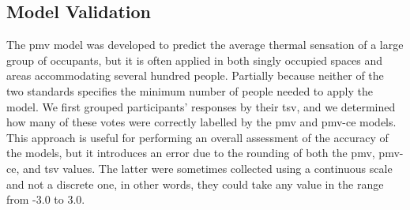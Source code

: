 \subsection{Model Validation}\label{subsec:model-validation}
The \ac{pmv} model was developed to predict the average thermal sensation of a large group of occupants, but it is often applied in both singly occupied spaces and areas accommodating several hundred people.
Partially because neither of the two standards specifies the minimum number of people needed to apply the model.
We first grouped participants' responses by their \ac{tsv}, and we determined how many of these votes were correctly labelled by the \ac{pmv} and \ac{pmv-ce} models.
This approach is useful for performing an overall assessment of the accuracy of the models, but it introduces an error due to the rounding of both the \ac{pmv}, \ac{pmv-ce}, and \ac{tsv} values.
The latter were sometimes collected using a continuous scale and not a discrete one, in other words, they could take any value in the range from -3.0 to 3.0.

